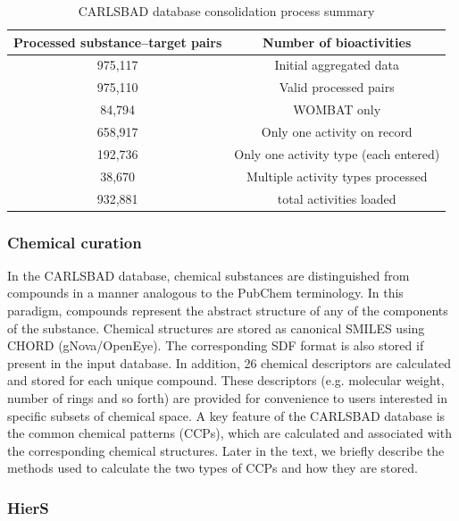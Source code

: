 \begin{table}[]
\centering
\begin{tabular}{c|c}
\hline
\textbf{Processed substance–target pairs} & \textbf{Number of bioactivities} \\
\hline
975,117 & Initial aggregated data   \\
975,110 & Valid processed pairs   \\
84,794 & WOMBAT only   \\
658,917 & Only one activity on record  \\ 
192,736 & Only one activity type (each entered)  \\ 
38,670 & Multiple activity types processed   \\
932,881 & total activities loaded   \\
\hline
\end{tabular}
\caption{CARLSBAD database consolidation process summary}
\label{tab:cb_01}
\end{table}

\subsubsection{Chemical curation}

In the CARLSBAD database, chemical substances are distinguished from compounds in a manner analogous to the PubChem terminology. In this paradigm, compounds represent the abstract structure of any of the components of the substance. Chemical structures are stored as canonical SMILES using CHORD (gNova/OpenEye). The corresponding SDF format is also stored if present in the input database. In addition, 26 chemical descriptors are calculated and stored for each unique compound. These descriptors (e.g. molecular weight, number of rings and so forth) are provided for convenience to users interested in specific subsets of chemical space. A key feature of the CARLSBAD database is the common chemical patterns (CCPs), which are calculated and associated with the corresponding chemical structures. Later in the text, we briefly describe the methods used to calculate the two types of CCPs and how they are stored.

\subsubsection{HierS}

